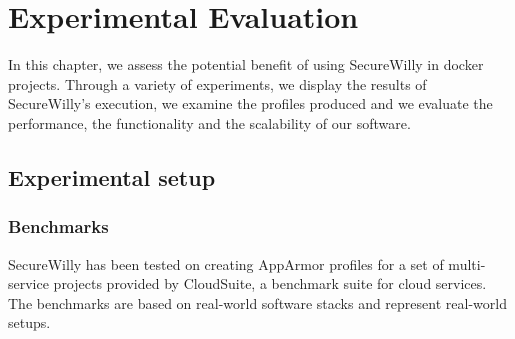 \chapter{Experimental Evaluation}

In this chapter, we assess the potential benefit of using SecureWilly in docker projects. Through a variety of experiments, we display the results of SecureWilly's execution, we examine the profiles produced and we evaluate the performance, the functionality and the scalability of our software.

\section{Experimental setup}
\subsection{Benchmarks}
SecureWilly has been tested on creating AppArmor profiles for a set of multi-service projects provided by CloudSuite, a benchmark suite for cloud services. \cite{cloudsuite} The benchmarks are based on real-world software stacks and represent real-world setups. 

